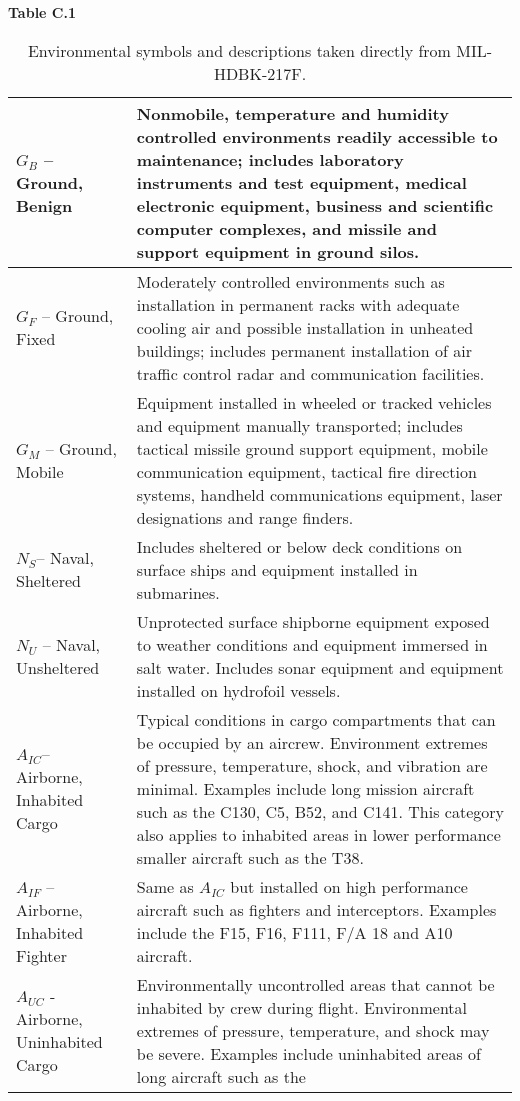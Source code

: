\textbf{Table C.1}
\begin{table}
\caption{ Environmental symbols and descriptions taken directly
from MIL-HDBK-217F.}
\label{table:envSymbols}
\begin{tabular}{|l|m{10cm}|}
\hline
$G_{B}$ -- Ground, Benign & Nonmobile, temperature and
humidity controlled environments readily accessible to maintenance;
includes laboratory instruments and test equipment, medical electronic
equipment, business and scientific computer complexes, and missile and
support equipment in ground silos. \\ \hline
$G_{F}$ -- Ground, Fixed & Moderately controlled environments
such as installation in permanent racks with adequate cooling air and
possible installation in unheated buildings; includes permanent
installation of air traffic control radar and communication
facilities. \\ \hline
$G_{M}$ -- Ground, Mobile & Equipment installed in wheeled or
tracked vehicles and equipment manually transported; includes tactical
missile ground support equipment, mobile communication equipment,
tactical fire direction systems, handheld communications equipment,
laser designations and range finders. \\ \hline
$N_{S}$-- Naval, Sheltered & Includes sheltered or below
deck conditions on surface ships and equipment installed in
submarines. \\ \hline
$N_{U}$ -- Naval, Unsheltered & Unprotected surface shipborne
equipment exposed to weather conditions and equipment immersed in salt
water. Includes sonar equipment and equipment installed on hydrofoil
vessels. \\ \hline
$A_{IC}$-- Airborne, Inhabited Cargo & Typical conditions in
cargo compartments that can be occupied by an aircrew. Environment
extremes of pressure, temperature, shock, and vibration are minimal.
Examples include long mission aircraft such as the C130, C5, B52, and
C141. This category also applies to inhabited areas in lower performance
smaller aircraft such as the T38. \\ \hline
$A_{IF}$ -- Airborne, Inhabited Fighter & Same as 
$A_{IC}$ but installed on high performance aircraft such as
fighters and interceptors. Examples include the F15, F16, F111, F/A 18
and A10 aircraft. \\ \hline
$A_{UC}$ - Airborne, Uninhabited Cargo & Environmentally
uncontrolled areas that cannot be inhabited by crew during flight.
Environmental extremes of pressure, temperature, and shock may be
severe. Examples include uninhabited areas of long aircraft such as the

\end{tabular}
\end{table}
